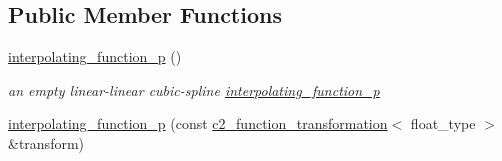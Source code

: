 \subsection*{Public Member Functions}
\begin{DoxyCompactItemize}
\item 
\hyperlink{classinterpolating__function__p_ad964e7b37271708c1d505ae3fd9c7722}{interpolating\-\_\-function\-\_\-p} ()
\begin{DoxyCompactList}\small\item\em an empty linear-\/linear cubic-\/spline \hyperlink{classinterpolating__function__p}{interpolating\-\_\-function\-\_\-p} \end{DoxyCompactList}\item 
\hypertarget{classinterpolating__function__p_aac529a5b217fb8b362e008ce2ddcfccc}{\hyperlink{classinterpolating__function__p_aac529a5b217fb8b362e008ce2ddcfccc}{interpolating\-\_\-function\-\_\-p} (const \hyperlink{classc2__function__transformation}{c2\-\_\-function\-\_\-transformation}$<$ float\-\_\-type $>$ \&transform)}\label{classinterpolating__function__p_aac529a5b217fb8b362e008ce2ddcfccc}


\end{DoxyCompactItemize}

